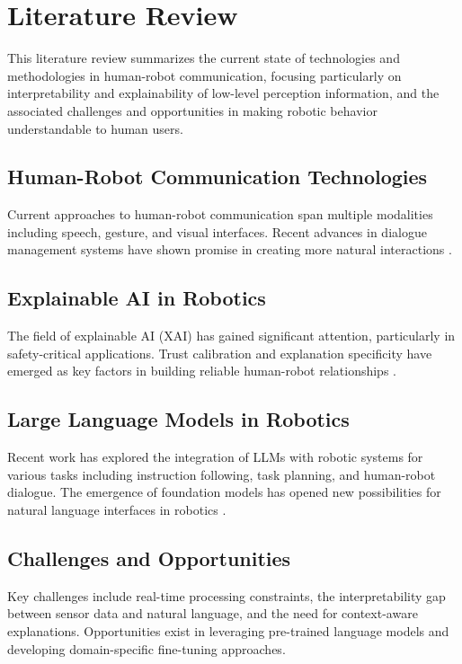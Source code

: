 \section{Literature Review}

This literature review summarizes the current state of technologies and methodologies in human-robot communication, focusing particularly on interpretability and explainability of low-level perception information, and the associated challenges and opportunities in making robotic behavior understandable to human users.

\subsection{Human-Robot Communication Technologies}

Current approaches to human-robot communication span multiple modalities including speech, gesture, and visual interfaces.
Recent advances in dialogue management systems have shown promise in creating more natural interactions \cite{dialogue_management_2023}.

\subsection{Explainable AI in Robotics}

The field of explainable AI (XAI) has gained significant attention, particularly in safety-critical applications.
Trust calibration and explanation specificity have emerged as key factors in building reliable human-robot relationships \cite{trust_explainable_robots_2020}.

\subsection{Large Language Models in Robotics}

Recent work has explored the integration of LLMs with robotic systems for various tasks including instruction following, task planning, and human-robot dialogue.
The emergence of foundation models has opened new possibilities for natural language interfaces in robotics \cite{llm_robotics_2024}.

\subsection{Challenges and Opportunities}

Key challenges include real-time processing constraints, the interpretability gap between sensor data and natural language, and the need for context-aware explanations.
Opportunities exist in leveraging pre-trained language models and developing domain-specific fine-tuning approaches.
